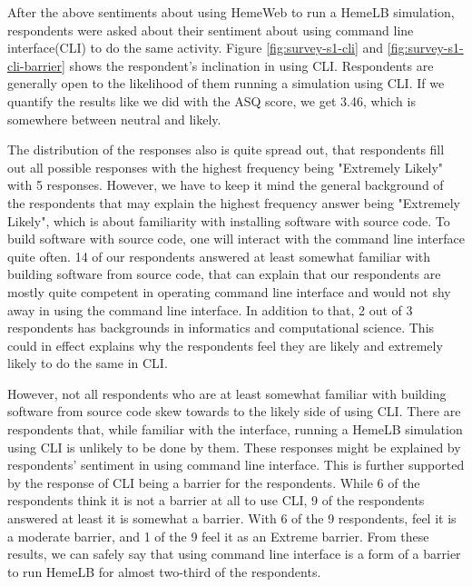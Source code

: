 \vspace{0.5cm}

After the above sentiments about using HemeWeb to run a HemeLB simulation, respondents were asked about their sentiment about using command line interface(CLI) to do the same activity. Figure \ref{fig:survey-s1-cli} and \ref{fig:survey-s1-cli-barrier} shows the respondent's inclination in using CLI. Respondents are generally open to the likelihood of them running a simulation using CLI. If we quantify the results like we did with the ASQ score, we get 3.46, which is somewhere between neutral and likely. 

The distribution of the responses also is quite spread out, that respondents fill out all possible responses with   the highest frequency being "Extremely Likely" with 5 responses. However, we have to keep it mind the general background of the respondents that may explain the highest frequency answer being "Extremely Likely", which is about familiarity with installing software with source code. To build software with source code, one will interact with the command line interface quite often. 14 of our respondents answered at least somewhat familiar with building software from source code, that can explain that our respondents are mostly quite competent in operating command line interface and would not shy away in using the command line interface. In addition to that, 2 out of 3 respondents has backgrounds in informatics and computational science. This could in effect explains why the respondents feel they are likely and extremely likely to do the same in CLI. 

However, not all respondents who are at least somewhat familiar with building software from source code skew towards to the likely side of using CLI. There are respondents that, while familiar with the interface, running a HemeLB simulation using CLI is unlikely to be done by them. These responses might be explained by respondents' sentiment in using command line interface. This is further supported by the response of CLI being a barrier for the respondents. While 6 of the respondents think it is not a barrier at all to use CLI, 9 of the respondents answered at least it is somewhat a barrier. With 6 of the 9 respondents, feel it is a moderate barrier, and 1 of the 9 feel it as an Extreme barrier. From these results, we can safely say that using command line interface is a form of a barrier to run HemeLB for almost two-third of the respondents.





